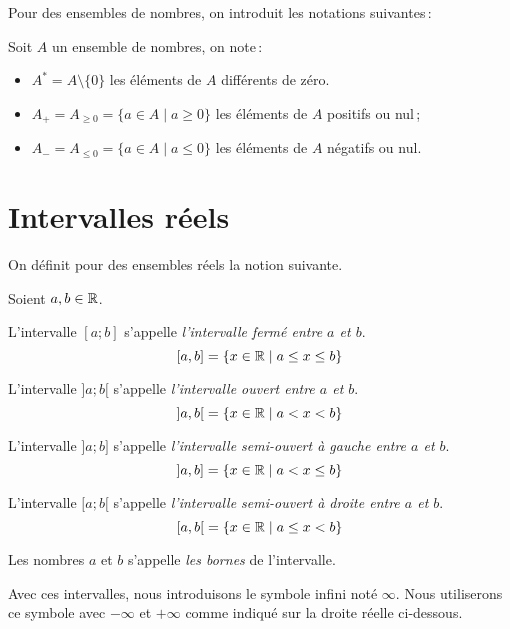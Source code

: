 \documentclass[a4paper,12pt]{report}
\begin{document}
Pour des ensembles de nombres, on introduit les notations suivantes\,:
\begin{notation}
	Soit $A$ un ensemble de nombres, on note\,:
	\begin{itemize}
	\item[{\PencilRightDown}]	 $A^*=A\setminus \{0\}$ les éléments de $A$ différents de zéro.
	\item[{\PencilRightDown}] $A_+=A_{\geq 0}=\{a\in A \mid a\geq 0\}$ les éléments de $A$ positifs ou nul\,;
	\item[{\PencilRightDown}] $A_-=A_{\leq 0}=\{a\in A \mid a\leq 0\}$ les éléments de $A$ négatifs ou nul.
	\end{itemize}
\end{notation}

\section{Intervalles réels}

On définit pour des ensembles réels la notion suivante.
\begin{defi}
	Soient $a,b\in \mathbb R$.
	\begin{description}[leftmargin=2cm]
		\item[] L'intervalle $[a;b]$ s'appelle \emph{l'intervalle fermé entre $a$ et $b$}. 
			\[\interval{a}{b}=\{x\in \R \mid a\leq x \leq b\}\]

		\item[] L'intervalle $]a;b[$ s'appelle \emph{l'intervalle ouvert entre $a$ et $b$}. 
			\[\interval[open]{a}{b}=\{x\in \R \mid a < x < b\}\]

		\item[] L'intervalle $]a;b]$ s'appelle \emph{l'intervalle semi-ouvert à gauche entre $a$ et $b$}. 
			\[\interval[open left]{a}{b}=\{x\in \R \mid a< x \leq b\}\]

		\item[] L'intervalle $[a;b[$ s'appelle \emph{l'intervalle semi-ouvert à droite entre $a$ et $b$}. 
			\[\interval[open right]{a}{b}=\{x\in \R \mid a\leq x < b\}\]
 \end{description}
 Les nombres $a$ et $b$ s'appelle \emph{les bornes} de l'intervalle.
\end{defi}
Avec ces intervalles, nous introduisons le symbole infini noté $\infty$.
Nous utiliserons ce symbole avec $-\infty$ et $+\infty$ comme indiqué sur la droite réelle ci-dessous. 
\end{document}
